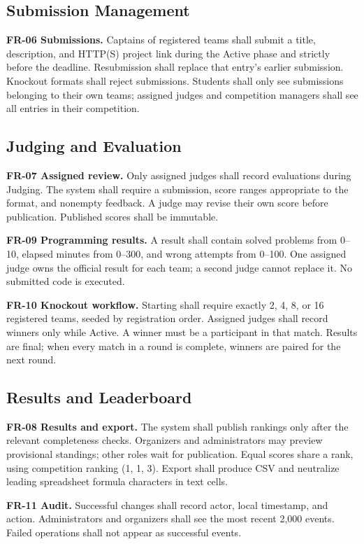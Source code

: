 \subsection{Submission Management}
\textbf{FR-06 Submissions.} Captains of registered teams shall submit a title, description, and HTTP(S) project link during the Active phase and strictly before the deadline. Resubmission shall replace that entry's earlier submission. Knockout formats shall reject submissions. Students shall only see submissions belonging to their own teams; assigned judges and competition managers shall see all entries in their competition.
\subsection{Judging and Evaluation}
\textbf{FR-07 Assigned review.} Only assigned judges shall record evaluations during Judging. The system shall require a submission, score ranges appropriate to the format, and nonempty feedback. A judge may revise their own score before publication. Published scores shall be immutable.\par
\textbf{FR-09 Programming results.} A result shall contain solved problems from 0--10, elapsed minutes from 0--300, and wrong attempts from 0--100. One assigned judge owns the official result for each team; a second judge cannot replace it. No submitted code is executed.\par
\textbf{FR-10 Knockout workflow.} Starting shall require exactly 2, 4, 8, or 16 registered teams, seeded by registration order. Assigned judges shall record winners only while Active. A winner must be a participant in that match. Results are final; when every match in a round is complete, winners are paired for the next round.
\subsection{Results and Leaderboard}
\textbf{FR-08 Results and export.} The system shall publish rankings only after the relevant completeness checks. Organizers and administrators may preview provisional standings; other roles wait for publication. Equal scores share a rank, using competition ranking (1, 1, 3). Export shall produce CSV and neutralize leading spreadsheet formula characters in text cells.\par
\textbf{FR-11 Audit.} Successful changes shall record actor, local timestamp, and action. Administrators and organizers shall see the most recent 2,000 events. Failed operations shall not appear as successful events.

